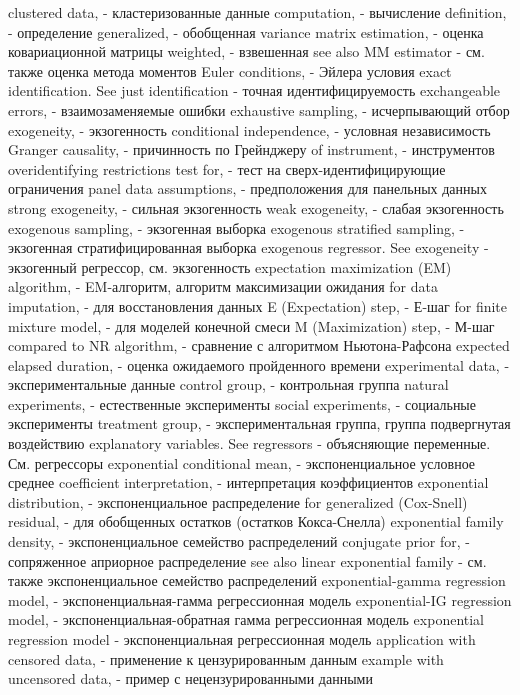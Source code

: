 clustered data, - кластеризованные данные
computation, - вычисление
definition, - определение
generalized, - обобщенная
variance matrix estimation, - оценка ковариационной матрицы
weighted, - взвешенная
see also MM estimator - см. также оценка метода моментов
Euler conditions, - Эйлера условия
exact identification. See just identification - точная идентифицируемость
exchangeable errors, - взаимозаменяемые ошибки
exhaustive sampling, - исчерпывающий отбор
exogeneity, - экзогенность
conditional independence, - условная независимость
Granger causality, - причинность по Грейнджеру
of instrument, - инструментов
overidentifying restrictions test for, - тест на сверх-идентифицирующие ограничения
panel data assumptions, - предположения для панельных данных
strong exogeneity, - сильная экзогенность
weak exogeneity, - слабая экзогенность
exogenous sampling, - экзогенная выборка
exogenous stratified sampling, - экзогенная стратифицированная выборка
exogenous regressor. See exogeneity - экзогенный регрессор, см. экзогенность
expectation maximization (EM) algorithm, - EM-алгоритм, алгоритм максимизации ожидания
for data imputation, - для восстановления данных
E (Expectation) step, - Е-шаг
for finite mixture model, - для моделей конечной смеси
M (Maximization) step, - М-шаг
compared to NR algorithm, - сравнение с алгоритмом Ньютона-Рафсона
expected elapsed duration, - оценка ожидаемого пройденного времени
experimental data, - экспериментальные данные
control group, - контрольная группа
natural experiments, - естественные эксперименты
social experiments, - социальные эксперименты
treatment group, - экспериментальная группа, группа подвергнутая воздействию
explanatory variables. See regressors - объясняющие переменные. См. регрессоры
exponential conditional mean, - экспоненциальное условное среднее
coefficient interpretation, - интерпретация коэффициентов
exponential distribution, - экспоненциальное распределение
for generalized (Cox-Snell) residual, - для обобщенных остатков (остатков Кокса-Снелла)
exponential family density, - экспоненциальное семейство распределений
conjugate prior for, - сопряженное априорное распределение
see also linear exponential family - см. также экспоненциальное семейство распределений
exponential-gamma regression model, - экспоненциальная-гамма регрессионная модель
exponential-IG regression model, - экспоненциальная-обратная гамма регрессионная модель
exponential regression model - экспоненциальная регрессионная модель
application with censored data, - применение к цензурированным данным
example with uncensored data, - пример с нецензурированными данными
